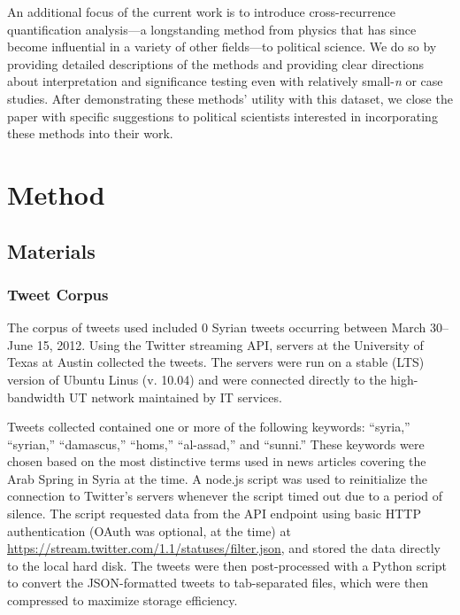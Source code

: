 \documentclass[
  english,
  man]{apa6}
\begin{document}
An additional focus of the current work is to introduce cross-recurrence
quantification analysis---a longstanding method from physics that has since
become influential in a variety of other fields---to political science. We do so
by providing detailed descriptions of the methods and providing clear directions
about interpretation and significance testing even with relatively small-\emph{n} or
case studies. After demonstrating these methods' utility with this dataset, we
close the paper with specific suggestions to political scientists interested in
incorporating these methods into their work.

\hypertarget{method}{%
\section{Method}\label{method}}

\hypertarget{materials}{%
\subsection{Materials}\label{materials}}

\hypertarget{tweet-corpus}{%
\subsubsection{Tweet Corpus}\label{tweet-corpus}}

The corpus of tweets used included 0 Syrian tweets
occurring between March 30--June 15, 2012. Using the Twitter streaming API,
servers at the University of Texas at Austin collected the tweets. The servers
were run on a stable (LTS) version of Ubuntu Linus (v. 10.04) and were connected
directly to the high-bandwidth UT network maintained by IT services.

Tweets collected contained one or more of the following keywords: \enquote{syria,}
\enquote{syrian,} \enquote{damascus,} \enquote{homs,} \enquote{al-assad,} and \enquote{sunni.} These keywords were
chosen based on the most distinctive terms used in news articles covering the
Arab Spring in Syria at the time. A node.js script was used to reinitialize the
connection to Twitter's servers whenever the script timed out due to a period of
silence. The script requested data from the API endpoint using basic HTTP
authentication (OAuth was optional, at the time) at
\url{https://stream.twitter.com/1.1/statuses/filter.json}, and stored the data
directly to the local hard disk. The tweets were then post-processed with a
Python script to convert the JSON-formatted tweets to tab-separated files, which
were then compressed to maximize storage efficiency.
\end{document}
